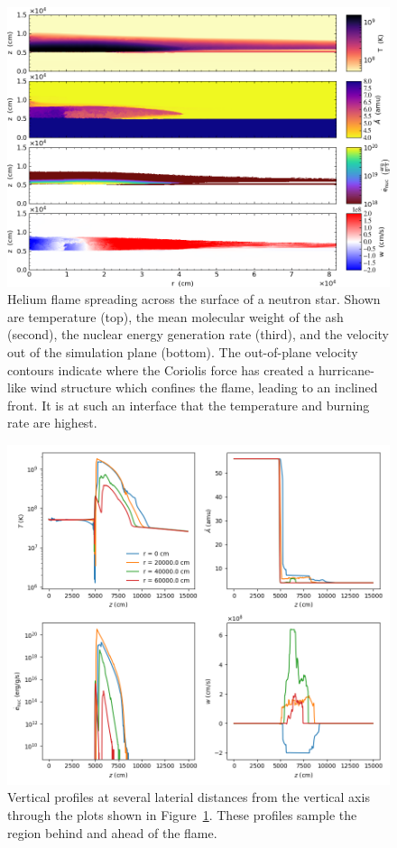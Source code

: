 \documentclass[a4paper]{jpconf}
\begin{document}
\begin{figure}[t]
\centering
\includegraphics[width=\linewidth]{xrb}
\caption{\label{fig:xrb} Helium flame spreading across the surface of
  a neutron star.  Shown are temperature (top), the mean molecular
  weight of the ash (second), the nuclear energy generation rate
  (third), and the velocity out of the simulation plane (bottom).  The
  out-of-plane velocity contours indicate where the Coriolis force has
  created a hurricane-like wind structure which confines the flame,
  leading to an inclined front. It is at such an interface that the
  temperature and burning rate are highest.  }
\end{figure}

\begin{figure}[t]
\centering
\includegraphics[width=0.9\linewidth]{xrb_profiles}
\caption{\label{fig:xrb_profiles} Vertical profiles at several laterial distances
  from the vertical axis through the plots shown in Figure~\ref{fig:xrb}.  These
  profiles sample the region behind and ahead of the flame.}
\end{figure}
\end{document}
